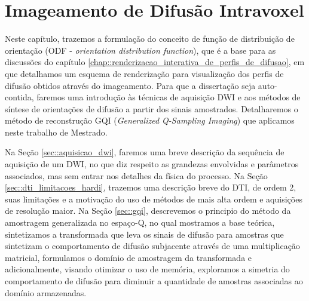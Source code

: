 \documentclass[
    12pt,                %
    oneside,            %
    a4paper,            %
    english,            %
    french,                %
    spanish,            %
    brazil                %
    ]{abntex2}
\begin{document}
\chapter{Imageamento de Difusão Intravoxel}
\label{chapter::metodos_hardi}

Neste capítulo, trazemos a formulação do conceito de função de distribuição de orientação (ODF - \textit{orientation distribution function}), que é a base para as discussões do capítulo \ref{chap::renderizacao_interativa_de_perfis_de_difusao}, em que detalhamos um esquema de renderização para visualização dos perfis de difusão obtidos através do imageamento. Para que a dissertação seja auto-contida, faremos uma introdução às técnicas de aquisição DWI e aos métodos de síntese de orientações de difusão a partir dos sinais amostrados. Detalharemos o método de reconstrução GQI (\textit{Generalized Q-Sampling Imaging}) que aplicamos neste trabalho de Mestrado.

Na Seção \ref{sec::aquisicao_dwi}, faremos uma breve descrição da sequência de aquisição de um DWI, no que diz respeito as grandezas envolvidas e parâmetros associados, mas sem entrar nos detalhes da física do processo. Na Seção \ref{sec::dti_limitacoes_hardi}, trazemos uma descrição breve do DTI, de ordem 2, suas limitações e a motivação do uso de métodos de mais alta ordem e aquisições de resolução maior. Na Seção \ref{sec::gqi}, descrevemos o principio do método da amostragem generalizada no espaço-Q, no qual mostramos a base teórica, sintetizamos a transformada que leva os sinais de difusão para amostras que sintetizam o comportamento de difusão subjacente através de uma multiplicação matricial, formulamos o domínio de amostragem da transformada e adicionalmente, visando otimizar o uso de memória, exploramos a simetria do comportamento de difusão para diminuir a quantidade de amostras associadas ao domínio armazenadas.
\end{document}
